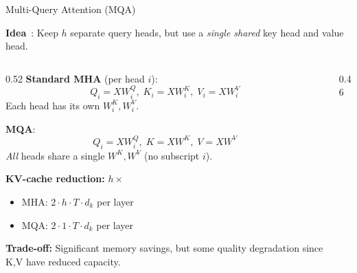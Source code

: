 \begin{frame}{Multi-Query Attention (MQA)}

  \textbf{Idea}~\cite{shazeer2019mqattention}: Keep $h$ separate query heads, but use a
  \emph{single shared} key head and value head.

  \vspace{0.3em}
  \begin{columns}[T]
    \begin{column}{0.52\textwidth}
      \textbf{Standard MHA} (per head $i$):
      \[
        Q_i = X W_i^Q,\; K_i = X W_i^K,\; V_i = X W_i^V
      \]
      Each head has its own $W_i^K, W_i^V$.

      \vspace{0.3em}
      \textbf{MQA}:
      \[
        Q_i = X W_i^Q,\; K = X W^K,\; V = X W^V
      \]
      \emph{All} heads share a single $W^K, W^V$ (no subscript $i$).

      \vspace{0.3em}
      \textbf{KV-cache reduction:} $h \times$
      \begin{itemize}
        \item MHA: $2 \cdot h \cdot T \cdot d_k$ per layer
        \item MQA: $2 \cdot 1 \cdot T \cdot d_k$ per layer
      \end{itemize}

      \vspace{0.3em}
      \textbf{Trade-off:} Significant memory savings, but some quality degradation since K,V have reduced capacity.
    \end{column}
    \begin{column}{0.46\textwidth}
      \centering
\end{column}
\end{columns}
\end{frame}

